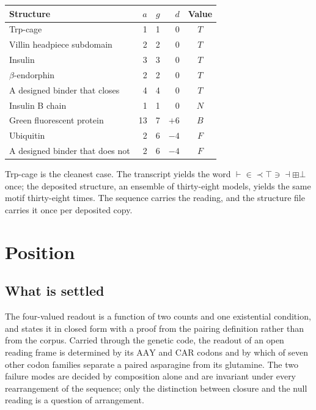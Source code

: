 \documentclass[12pt,a4paper]{article}
\begin{document}
\begin{center}
\begin{tabular}{lrrrc}
\toprule
Structure & $a$ & $g$ & $d$ & Value \\
\midrule
Trp-cage                 & 1 & 1 & $0$  & $T$ \\
Villin headpiece subdomain & 2 & 2 & $0$  & $T$ \\
Insulin                  & 3 & 3 & $0$  & $T$ \\
$\beta$-endorphin        & 2 & 2 & $0$  & $T$ \\
A designed binder that closes & 4 & 4 & $0$  & $T$ \\
Insulin B chain          & 1 & 1 & $0$  & $N$ \\
Green fluorescent protein & 13 & 7 & $+6$ & $B$ \\
Ubiquitin                & 2 & 6 & $-4$ & $F$ \\
A designed binder that does not & 2 & 6 & $-4$ & $F$ \\
\bottomrule
\end{tabular}
\end{center}

Trp-cage is the cleanest case. The transcript yields the word
$\vdash \in \prec \top \ni \dashv \boxplus \bot$ once; the deposited structure, an
ensemble of thirty-eight models, yields the same motif thirty-eight times. The
sequence carries the reading, and the structure file carries it once per deposited
copy.

\section{Position}

\subsection{What is settled}

The four-valued readout is a function of two counts and one existential condition,
and  states it in closed form with a proof from the pairing
definition rather than from the corpus. Carried through the genetic code, the
readout of an open reading frame is determined by its $\mathrm{AAY}$ and
$\mathrm{CAR}$ codons and by which of seven other codon families separate a paired
asparagine from its glutamine. The two failure modes are decided by composition
alone and are invariant under every rearrangement of the sequence; only the
distinction between closure and the null reading is a question of arrangement.
\end{document}
